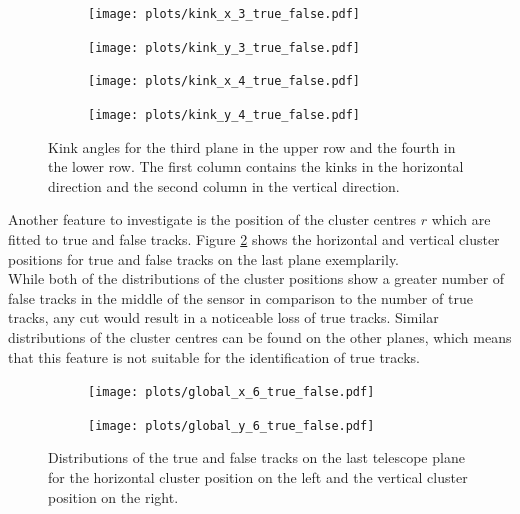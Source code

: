 \begin{figure}
  \hspace{-0.4cm}
  \begin{subfigure}{0.51\textwidth}
      \texttt{[image: plots/kink\_x\_3\_true\_false.pdf]}
  \end{subfigure}
  \begin{subfigure}{0.51\textwidth}
      \hspace{-0.19cm}
      \texttt{[image: plots/kink\_y\_3\_true\_false.pdf]}
  \end{subfigure}
  \begin{subfigure}{0.51\textwidth}
    \hspace{-0.4cm}
      \texttt{[image: plots/kink\_x\_4\_true\_false.pdf]}
  \end{subfigure}
  \begin{subfigure}{0.51\textwidth}
    \hspace{-0.4cm}
      \hspace{-0.19cm}
      \texttt{[image: plots/kink\_y\_4\_true\_false.pdf]}
  \end{subfigure}
  \caption{Kink angles for the third plane in the upper row and the fourth in the lower row. The first column contains the kinks in the horizontal direction and the second column in
  the vertical direction.}
  \label{fig:kinks}
\end{figure}



Another feature to investigate is the position of the cluster centres $r$ which are fitted to true and false tracks. Figure \ref{fig:clus_pos} shows the
horizontal and vertical cluster positions for true and false tracks on the last plane exemplarily. \\
While both of the distributions of the cluster positions show a greater number of false tracks in the middle of the sensor in comparison to the number of true tracks,
any cut would result in a noticeable loss of true tracks. Similar distributions of the cluster centres can be found on the other planes, which means that this feature
is not suitable for the identification of true tracks.

\begin{figure}
  \hspace{-0.45cm}
  \begin{subfigure}{0.51\textwidth}
      \centering
      \texttt{[image: plots/global\_x\_6\_true\_false.pdf]}
  \end{subfigure}
  \begin{subfigure}{0.51\textwidth}
      \hspace{-0.10cm}
      \texttt{[image: plots/global\_y\_6\_true\_false.pdf]}
  \end{subfigure}
  \caption{Distributions of the true and false tracks on the last telescope plane for the horizontal cluster position on the left and the vertical cluster position on the right.}
  \label{fig:clus_pos}
\end{figure}



